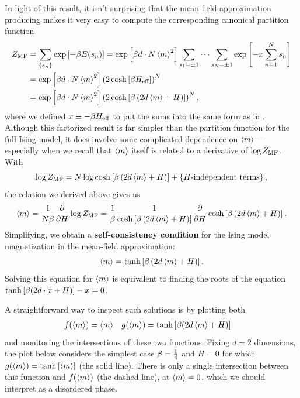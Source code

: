 \newpage %
In light of this result, it isn't surprising that the mean-field approximation producing  makes it very easy to compute the corresponding canonical partition function
\begin{align}
  Z_{\text{MF}} & = \sum_{\left\{s_n\right\}} \exp\left[-\beta E(s_n)\right] = \exp\left[\beta d\cdot N \left\langle m \right\rangle^2\right] \sum_{s_1 = \pm 1} \cdots \sum_{s_N = \pm 1} \exp\left[-x \sum_{n = 1}^N s_n\right] \cr
       & = \exp\left[\beta d\cdot N \left\langle m \right\rangle^2\right] \left(2\cosh\left[\beta H_{\text{eff}}\right]\right)^N \nonumber \\
       & = \exp\left[\beta d\cdot N \left\langle m \right\rangle^2\right] \left(2\cosh\left[\beta \left(2d\left\langle m \right\rangle + H\right)\right]\right)^N,
\end{align}
where we defined $x \equiv -\beta H_{\text{eff}}$ to put the sums into the same form as in .
Although this factorized result is far simpler than the partition function for the full Ising model, it does involve some complicated dependence on $\left\langle m \right\rangle$ --- especially when we recall that $\left\langle m \right\rangle$ itself is related to a derivative of $\log Z_{\text{MF}}$. %
With
\begin{equation*}
  \log Z_{\text{MF}} = N\log \cosh\left[\beta \left(2d\left\langle m \right\rangle + H\right)\right] + \left\{H\mbox{-independent terms}\right\},
\end{equation*}
the relation we derived above gives us
\begin{equation*}
  \left\langle m \right\rangle = \frac{1}{N\beta} \frac{\partial }{\partial H}\log Z_{\text{MF}} = \frac{1}{\beta} \frac{1}{\cosh\left[\beta \left(2d\left\langle m \right\rangle + H\right)\right]} \frac{\partial }{\partial H}\cosh\left[\beta \left(2d\left\langle m \right\rangle + H\right)\right].
\end{equation*}
Simplifying, we obtain a \textbf{self-consistency condition} for the Ising model magnetization in the mean-field approximation:
\begin{equation}
  \label{eq:consistency}
  \left\langle m \right\rangle = \tanh\left[\beta \left(2d\left\langle m \right\rangle + H\right)\right].
\end{equation}
Solving this equation for $\left\langle m \right\rangle$ is equivalent to finding the roots of the equation $\tanh\left[\beta (2d\cdot x + H)\right] - x = 0$.

A straightforward way to inspect such solutions is by plotting both
\begin{align*}
  f(\left\langle m \right\rangle) & = \left\langle m \right\rangle &
  g(\left\langle m \right\rangle) & = \tanh\left[\beta (2d\left\langle m \right\rangle + H)\right]
\end{align*}
and monitoring the intersections of these two functions.
Fixing $d = 2$ dimensions, the plot below considers the simplest case $\beta = \frac{1}{4}$ and $H = 0$ for which $g(\left\langle m \right\rangle) = \tanh\left[\left\langle m \right\rangle\right]$ (the solid line).
There is only a single intersection between this function and $f(\left\langle m \right\rangle)$ (the dashed line), at $\left\langle m \right\rangle = 0$, which we should interpret as a disordered phase.

